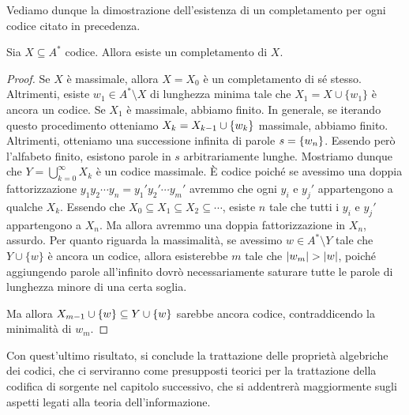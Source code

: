 Vediamo dunque la dimostrazione dell'esistenza di un completamento per ogni codice citato in precedenza.
\begin{proposition}{}
  Sia \(X \subseteq A^*\) codice. Allora esiste un completamento di \(X\).
\end{proposition}
\begin{proof}
  Se \(X\) è massimale, allora \(X = X_0\) è un completamento di sé stesso.
  Altrimenti, esiste \(w_1 \in A^*\setminus X\) di lunghezza minima tale che \(X_1 = X \cup \{w_1\}\) è ancora un codice.
  Se \(X_1\) è massimale, abbiamo finito.
  In generale, se iterando questo procedimento otteniamo \(X_k = X_{k-1} \cup \set{w_k}\) massimale, abbiamo finito.
  Altrimenti, otteniamo una successione infinita di parole \(s = \set{w_n}\). Essendo però l'alfabeto finito, esistono parole in \(s\) arbitrariamente lunghe.
  Mostriamo dunque che \(Y = \bigcup_{k = 0}^{\infty} X_k\) è un codice massimale.
  È codice poiché se avessimo una doppia fattorizzazione \(y_1 y_2 \cdots y_n = y_1' y_2' \cdots y_m'\) avremmo che ogni \(y_i\) e \(y_j'\) appartengono a qualche \(X_k\). Essendo che \(X_0 \subseteq X_1 \subseteq X_2 \subseteq \cdots\), esiste \(n\) tale che tutti i \(y_i\) e \(y_j'\) appartengono a \(X_n\). Ma allora avremmo una doppia fattorizzazione in \(X_n\), assurdo.
  Per quanto riguarda la massimalità, se avessimo \(w \in A^* \setminus Y\) tale che \(Y \cup \{w\}\) è ancora un codice, allora esisterebbe \(m\) tale che \(\left|w_m\right| > \left|w\right|\), poiché aggiungendo parole all'infinito dovrò necessariamente saturare tutte le parole di lunghezza minore di una certa soglia.
  
  Ma allora \(X_{m-1} \cup \set{w}\subseteq Y \cup \set{w}\) sarebbe ancora codice, contraddicendo la minimalità di \(w_m\).
\end{proof}

Con quest'ultimo risultato, si conclude la trattazione delle proprietà algebriche dei codici, che ci serviranno come presupposti teorici per la trattazione della codifica di sorgente nel capitolo successivo, che si addentrerà maggiormente sugli aspetti legati alla teoria dell'informazione.






